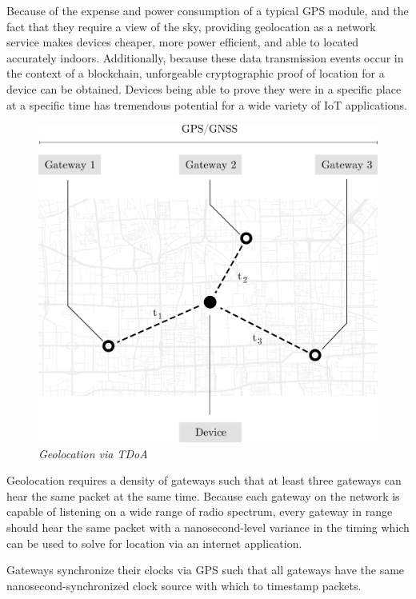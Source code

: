 \documentclass[letterpaper,11pt]{article}
\begin{document}
Because of the expense and power consumption of a typical GPS module, and the fact that they require a view of the sky, providing geolocation as a network service makes devices cheaper, more power efficient, and able to located accurately indoors. Additionally, because these data transmission events occur in the context of a blockchain, unforgeable cryptographic proof of location for a device can be obtained. Devices being able to prove they were in a specific place at a specific time has tremendous potential for a wide variety of IoT applications.

\begin{figure}[H]
    \begin{center}
          \includegraphics[scale=0.3]{tdoa.eps}
          \caption{\emph{Geolocation via TDoA}}
          \label{fig:tdoa}
     \end{center}
\end{figure}

Geolocation requires a density of gateways such that at least three gateways can hear the same packet at the same time. Because each gateway on the network is capable of listening on a wide range of radio spectrum, every gateway in range should hear the same packet with a nanosecond-level variance in the timing which can be used to solve for location via an internet application.

Gateways synchronize their clocks via GPS such that all gateways have the same nanosecond-synchronized clock source with which to timestamp packets.
\end{document}
